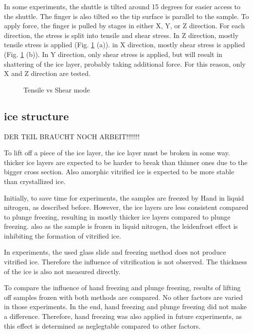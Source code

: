 In some experiments, the shuttle is tilted around 15 degrees for easier access to the shuttle. The finger is also tilted so the tip surface is parallel to the sample. To apply force, the finger is pulled by stages in either X, Y, or Z direction. For each direction, the stress is split into tensile and shear stress. In Z direction, mostly tensile stress is applied (Fig. \ref{fig:tensilevsshear} (a)). in X direction, mostly shear stress is applied (Fig. \ref{fig:tensilevsshear} (b)). In Y direction, only shear stress is applied, but will result in shattering of the ice layer, probably taking additional force. For this reason, only X and Z direction are tested.

\begin{figure}[hbt!]
	\centering
	
	\caption{Tensile vs Shear mode}
	\label{fig:tensilevsshear}
\end{figure}

\subsection{ice structure}

DER TEIL BRAUCHT NOCH ARBEIT!!!!!!!

To lift off a piece of the ice layer, the ice layer must be broken in some way. thicker ice layers are expected to be harder to break than thinner ones due to the bigger cross section. Also amorphic vitrified ice is expected to be more stable than crystallized ice.

Initially, to save time for experiments, the samples are freezed by Hand in liquid nitrogen, as described before. However, the ice layers are less consistent compared to plunge freezing, resulting in mostly thicker ice layers compared to plunge freezing. also as the sample is frozen in liquid nitrogen, the leidenfrost effect is inhibiting the formation of vitrified ice.

In experiments, the used glass slide and freezing method does not produce vitrified ice. Therefore the influence of vitrification is not observed. The thickness of the ice is also not measured directly. 

To compare the influence of hand freezing and plunge freezing, results of lifting off samples frozen with both methods are compared. No other factors are varied in those experiments. In the end, hand freezing and plunge freezing did not make a difference. Therefore, hand freezing was also applied in future experiments, as this effect is determined as neglegtable compared to other factors.

